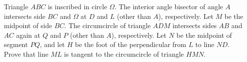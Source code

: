 Triangle $ABC$ is inscribed in circle $\Omega$. The interior angle bisector of angle $A$ intersects side $BC$ and $\Omega$ at $D$ and $L$ (other than $A$), respectively. Let $M$ be the midpoint of side $BC$. The circumcircle of triangle $ADM$ intersects sides $AB$ and $AC$ again at $Q$ and $P$ (other than $A$), respectively. Let $N$ be the midpoint of segment $PQ$, and let $H$ be the foot of the perpendicular from $L$ to line $ND$. Prove that line $ML$ is tangent to the circumcircle of triangle $HMN$.